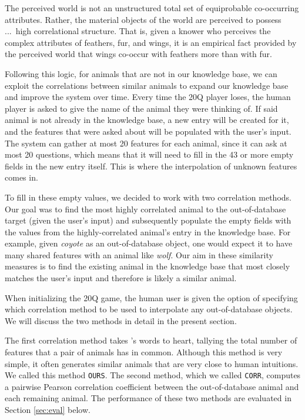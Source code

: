\documentclass[11pt,a4paper]{article}
\begin{document}
\begin{displayquote}
The perceived world is not an unstructured total set of equiprobable co-occurring attributes. Rather, the material objects of the world are perceived to possess ...\ high correlational structure.
That is, given a knower who perceives the complex attributes of feathers, fur, and wings, it is an empirical fact provided by the perceived world that wings co-occur with feathers more than with fur. \citep[29]{Rosch1978}
\end{displayquote}

Following this logic, for animals that are not in our knowledge base, we can exploit the correlations between similar animals to expand our knowledge base and improve the system over time.
Every time the 20Q player loses, the human player is asked to give the name of the animal they were thinking of. 
If said animal is not already in the knowledge base, a new entry will be created for it, and the features that were asked about will be populated with the user's input. 
The system can gather at most 20 features for each animal, since it can ask at most 20 questions, which means that it will need to fill in the 43 or more empty fields in the new entry itself.
This is where the interpolation of unknown features comes in.

To fill in these empty values, we decided to work with two correlation methods. 
Our goal was to find the most highly correlated animal to the out-of-database target (given the user's input) and subsequently populate the empty fields with the values from the highly-correlated animal's entry in the knowledge base. 
For example, given \textit{coyote} as an out-of-database object, one would expect it to have many shared features with an animal like \textit{wolf}. 
Our aim in these similarity measures is to find the existing animal in the knowledge base that most closely matches the user's input and therefore is likely a similar animal.

When initializing the 20Q game, the human user is given the option of specifying which correlation method to be used to interpolate any out-of-database objects. We will discuss the two methods in detail in the present section.

The first correlation method takes \citeauthor{Rosch1978}'s \citeyearpar{Rosch1978} words to heart, tallying the total number of features that a pair of animals has in common. Although this method is very simple, it often generates similar animals that are very close to human intuitions. We called this method \texttt{OURS}. 
The second method, which we called \texttt{CORR}, computes a pairwise Pearson correlation coefficient between the out-of-database animal and each remaining animal. 
The performance of these two methods are evaluated in Section \ref{sec:eval} below.
\end{document}
